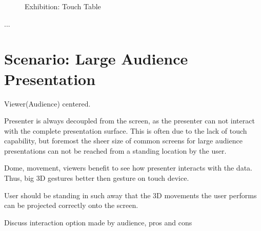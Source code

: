 \documentclass[review,journal]{vgtc}         %
\begin{document}
\begin{figure}[htb]
	\centering
	\caption{Exhibition: Touch Table}
	\label{img:exhibition_table}
\end{figure}

...

\section{Scenario: Large Audience Presentation}

Viewer(Audience) centered.

Presenter is always decoupled from the screen, as the presenter can not interact with the complete presentation surface. This is often due to the lack of touch capability, but foremost the sheer size of common screens for large audience presentations can not be reached from a standing location by the user.

Dome, movement, viewers benefit to see how presenter interacts with the data.
Thus, big 3D gestures better then gesture on touch device.

User should be standing in such away that the 3D movements the user performs can be projected correctly onto the screen.

Discuss interaction option made by audience, pros and cons
\end{document}
